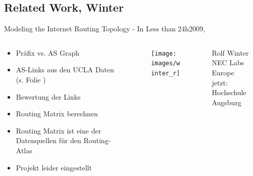 \documentclass[ngerman,compress,hyperref={bookmarks}]{beamer}
\begin{document}
\subsection{Related Work, Winter}
\begin{frame}{Modeling the Internet Routing Topology - In Less than 24h}{2009, \cite{Winter:2009:MIR:1577959.1577976}}
  \begin{columns}[c]
    \begin{column}{0.5\textwidth}
      \begin{itemize}
        \item Präfix vs. AS Graph
        \item AS-Links aus den UCLA Daten\\{\scriptsize{(s. Folie \pageref{zhang_et_al})}}
        \item Bewertung der Links
        \item Routing Matrix berechnen
      \end{itemize}
      {\small
      \begin{itemize}
        \item Routing Matrix ist eine der Datenquellen für den Routing-Atlas
        \item Projekt leider eingestellt
      \end{itemize}}
    \end{column}
    \begin{column}{0.09\textwidth}
      \begin{figure}
        \label{winter}
        \texttt{[image: images/winter\_r]}
      \end{figure}
    \end{column}
    \begin{column}{0.3\textwidth}
      {\scriptsize Rolf Winter\\
      \vspace{0.2cm}
      NEC Labs Europe\\jetzt: Hochschule Augsburg\\}
    \end{column}
  \end{columns}
\end{frame}
\end{document}
